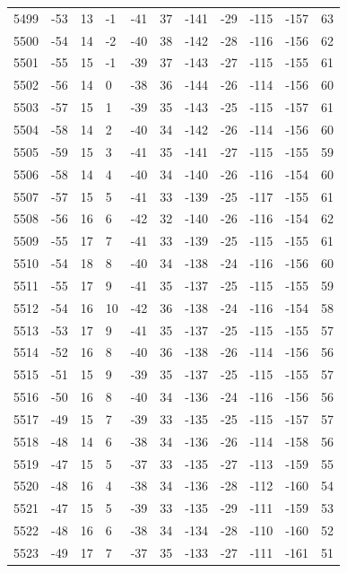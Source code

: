 \begin{table}[H]
\begin{tabular}{lllllllllll}
5499 & -53 & 13 & -1 & -41 & 37 & -141 & -29 & -115 & -157 & 63 \\
5500 & -54 & 14 & -2 & -40 & 38 & -142 & -28 & -116 & -156 & 62 \\
5501 & -55 & 15 & -1 & -39 & 37 & -143 & -27 & -115 & -155 & 61 \\
5502 & -56 & 14 & 0 & -38 & 36 & -144 & -26 & -114 & -156 & 60 \\
5503 & -57 & 15 & 1 & -39 & 35 & -143 & -25 & -115 & -157 & 61 \\
5504 & -58 & 14 & 2 & -40 & 34 & -142 & -26 & -114 & -156 & 60 \\
5505 & -59 & 15 & 3 & -41 & 35 & -141 & -27 & -115 & -155 & 59 \\
5506 & -58 & 14 & 4 & -40 & 34 & -140 & -26 & -116 & -154 & 60 \\
5507 & -57 & 15 & 5 & -41 & 33 & -139 & -25 & -117 & -155 & 61 \\
5508 & -56 & 16 & 6 & -42 & 32 & -140 & -26 & -116 & -154 & 62 \\
5509 & -55 & 17 & 7 & -41 & 33 & -139 & -25 & -115 & -155 & 61 \\
5510 & -54 & 18 & 8 & -40 & 34 & -138 & -24 & -116 & -156 & 60 \\
5511 & -55 & 17 & 9 & -41 & 35 & -137 & -25 & -115 & -155 & 59 \\
5512 & -54 & 16 & 10 & -42 & 36 & -138 & -24 & -116 & -154 & 58 \\
5513 & -53 & 17 & 9 & -41 & 35 & -137 & -25 & -115 & -155 & 57 \\
5514 & -52 & 16 & 8 & -40 & 36 & -138 & -26 & -114 & -156 & 56 \\
5515 & -51 & 15 & 9 & -39 & 35 & -137 & -25 & -115 & -155 & 57 \\
5516 & -50 & 16 & 8 & -40 & 34 & -136 & -24 & -116 & -156 & 56 \\
5517 & -49 & 15 & 7 & -39 & 33 & -135 & -25 & -115 & -157 & 57 \\
5518 & -48 & 14 & 6 & -38 & 34 & -136 & -26 & -114 & -158 & 56 \\
5519 & -47 & 15 & 5 & -37 & 33 & -135 & -27 & -113 & -159 & 55 \\
5520 & -48 & 16 & 4 & -38 & 34 & -136 & -28 & -112 & -160 & 54 \\
5521 & -47 & 15 & 5 & -39 & 33 & -135 & -29 & -111 & -159 & 53 \\
5522 & -48 & 16 & 6 & -38 & 34 & -134 & -28 & -110 & -160 & 52 \\
5523 & -49 & 17 & 7 & -37 & 35 & -133 & -27 & -111 & -161 & 51 \\

\end{tabular}
\end{table}
